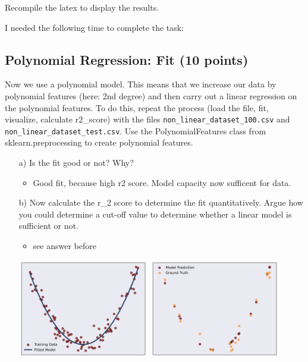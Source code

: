 \documentclass{article}
\begin{document}
Recompile the latex to display the results.

I needed the following time to complete the task:

\subsection{Polynomial Regression: Fit (10 points)}

Now we use a polynomial model. This means that we increase our data by polynomial features (here: 2nd degree) and then carry out a linear regression on the
polynomial features. To do this, repeat the process (load the file, fit, visualize, calculate r2\_score) with the files \texttt{non\_linear\_dataset\_100.csv} and \texttt{non\_linear\_dataset\_test.csv}.
Use the PolynomialFeatures class from sklearn.preprocessing to create polynomial features. 

\begin{enumerate}

\item[a)] Is the fit good or not? Why?
\begin{itemize}
	\item Good fit, because high r2 score. Model capacity now sufficent for data.
\end{itemize}

\item[b)] Now calculate the r\_2 score to determine the fit quantitatively. Argue how you could determine a cut-off value to determine whether a linear model is sufficient or not.
\begin{itemize}
	\item see answer before
\end{itemize}

\includegraphics[width=0.45\textwidth]{source_code/goodfit_polynomial_model.png}
\includegraphics[width=0.45\textwidth]{source_code/goodfit_polynomial_testdata.png}

\end{enumerate}
\end{document}
